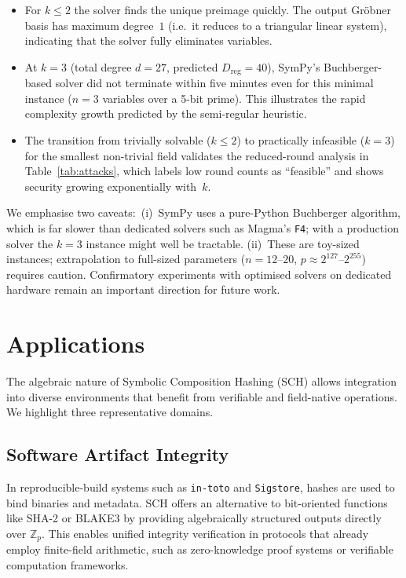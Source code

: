 ﻿\documentclass[english]{aucmcs}
\begin{document}
\begin{itemize}
  \item For $k \le 2$ the solver finds the unique preimage quickly.
    The output Gr\"obner basis has maximum degree~$1$ (i.e.\ it reduces to a
    triangular linear system), indicating that the solver fully eliminates
    variables.

  \item At $k = 3$ (total degree $d = 27$, predicted $D_{\mathrm{reg}} = 40$),
    SymPy's Buchberger-based solver did not terminate within five minutes
    even for this minimal instance ($n = 3$ variables over a 5-bit prime).
    This illustrates the rapid
    complexity growth predicted by the semi-regular heuristic.

  \item The transition from trivially solvable ($k \le 2$) to practically
    infeasible ($k = 3$) for the smallest non-trivial field validates the
    reduced-round analysis in Table~\ref{tab:attacks}, which labels low
    round counts as ``feasible'' and shows security growing exponentially
    with~$k$.
\end{itemize}

We emphasise two caveats:\ (i)~SymPy uses a pure-Python Buchberger
algorithm, which is far slower than dedicated solvers such as Magma's
\texttt{F4}; with a production solver the $k=3$ instance might well be
tractable. (ii)~These are toy-sized instances; extrapolation to
full-sized parameters ($n=12$--$20$, $p \approx 2^{127}$--$2^{255}$)
requires caution. Confirmatory experiments with optimised solvers on
dedicated hardware remain an important direction for future work.



\section{Applications}
\label{sec:apps}


The algebraic nature of Symbolic Composition Hashing (SCH) allows integration
into diverse environments that benefit from verifiable and field-native
operations.  We highlight three representative domains.

\subsection{Software Artifact Integrity}

In reproducible-build systems such as \texttt{in-toto} and \texttt{Sigstore},
hashes are used to bind binaries and metadata.  SCH offers an alternative to
bit-oriented functions like SHA-2 or BLAKE3 by providing algebraically
structured outputs directly over $\mathbb{Z}_p$.  This enables unified integrity
verification in protocols that already employ finite-field arithmetic, such as
zero-knowledge proof systems or verifiable computation frameworks.
\end{document}
